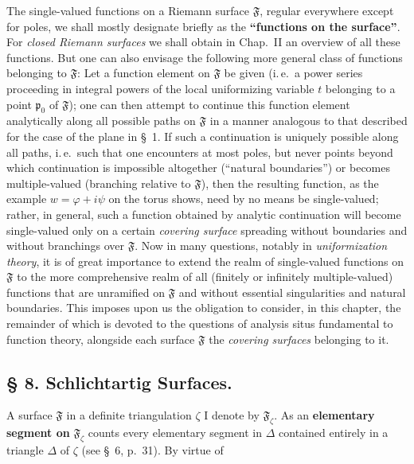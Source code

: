\documentclass{article}
\begin{document}
The single-valued functions on a Riemann surface $\mathfrak{F}$, regular everywhere except for poles, we shall mostly designate briefly as the \textbf{``functions on the surface''}. For \emph{closed Riemann surfaces} we shall obtain in Chap.~II an overview of all these functions. But one can also envisage the following more general class of functions belonging to $\mathfrak{F}$: Let a function element on $\mathfrak{F}$ be given (i.\,e.\ a power series proceeding in integral powers of the local uniformizing variable $t$ belonging to a point $\mathfrak{p}_0$ of $\mathfrak{F}$); one can then attempt to continue this function element analytically along all possible paths on $\mathfrak{F}$ in a manner analogous to that described for the case of the plane in §~1. If such a continuation is uniquely possible along all paths, i.\,e.\ such that one encounters at most poles, but never points beyond which continuation is impossible altogether (``natural boundaries'') or becomes multiple-valued (branching relative to $\mathfrak{F}$), then the resulting function, as the example $w = \varphi + i\psi$ on the torus shows, need by no means be single-valued; rather, in general, such a function obtained by analytic continuation will become single-valued only on a certain \emph{covering surface} spreading without boundaries and without branchings over $\mathfrak{F}$. Now in many questions, notably in \emph{uniformization theory}, it is of great importance to extend the realm of single-valued functions on $\mathfrak{F}$ to the more comprehensive realm of all (finitely or infinitely multiple-valued) functions that are unramified on $\mathfrak{F}$ and without essential singularities and natural boundaries. This imposes upon us the obligation to consider, in this chapter, the remainder of which is devoted to the questions of analysis situs fundamental to function theory, alongside each surface $\mathfrak{F}$ the \emph{covering surfaces} belonging to it.

\subsection*{§ 8. Schlichtartig Surfaces.}

A surface $\mathfrak{F}$ in a definite triangulation $\zeta$ I denote by $\mathfrak{F}_\zeta$. As an \textbf{elementary segment on} $\mathfrak{F}_\zeta$ counts every elementary segment in $\Delta$ contained entirely in a triangle $\Delta$ of $\zeta$ (see §~6, p.~31). By virtue of
\end{document}
